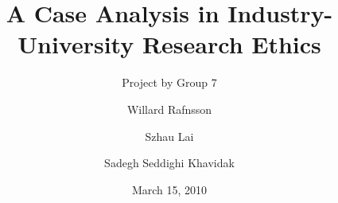\documentclass[draft,11pt,openright,monochrome,british,a4paper]{scrartcl}
\begin{document}
\title{A Case Analysis in Industry-University Research Ethics}
\author{Willard Rafnsson \and Szhau Lai \and Sadegh Seddighi Khavidak}
\subtitle{Project by Group 7}
\date{March 15, 2010}
\subject{Ethics, Science \& Society}
\maketitle

\end{document}
